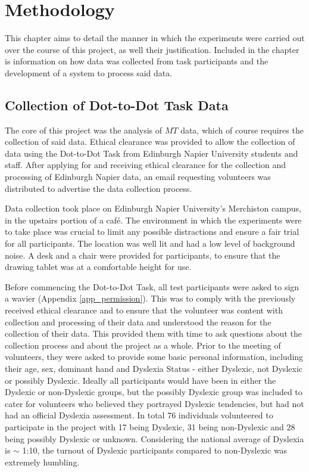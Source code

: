 \section{Methodology}
	This chapter aims to detail the manner in which the experiments were carried out over the course of this project, as well their justification. Included in the chapter is information on how data was collected from task participants and the development of a system to process said data.

	\subsection{Collection of Dot-to-Dot Task Data}
		The core of this project was the analysis of \(MT\) data, which of course requires  the collection of said data. Ethical clearance was provided to allow the collection of data using the Dot-to-Dot Task from Edinburgh Napier University students and staff. After applying for and receiving ethical clearance for the collection and processing of Edinburgh Napier data, an email requesting volunteers was distributed to advertise the data collection process.
	
		Data collection took place on Edinburgh Napier University’s Merchiston campus, in the upstairs portion of a café. The environment in which the experiments were to take place was crucial to limit any possible distractions and ensure a fair trial for all participants. The location was well lit and had a low level of background noise. A desk and a chair were provided for participants, to ensure that the drawing tablet was at a comfortable height for use. 
	
		Before commencing the Dot-to-Dot Task, all test participants were asked to sign a wavier (Appendix \ref{app_permission}). This was to comply with the previously received ethical clearance and to ensure that the volunteer was content with collection and processing of their data and understood the reason for the collection of their data. This provided them with time to ask questions about the collection process and about the project as a whole. Prior to the meeting of volunteers, they were asked to provide some basic personal information, including their age, sex, dominant hand and Dyslexia Status - either Dyslexic, not Dyslexic or possibly Dyslexic. Ideally all participants would have been in either the Dyslexic or non-Dyslexic groups, but the possibly Dyslexic group was included to cater for volunteers who believed they portrayed Dyslexic tendencies, but had not had an official Dyslexia assessment. In total 76 individuals volunteered to participate in the project with 17 being Dyslexic, 31 being non-Dyslexic and 28 being possibly Dyslexic or unknown. Considering the national average of Dyslexia is $\sim$ 1:10, the turnout of Dyslexic participants compared to non-Dyslexic was extremely humbling.
	
